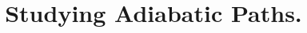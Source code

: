 \documentclass[manuscript,screen,review]{acmart}
\begin{document}

\title{ Studying Adiabatic Paths. }
\maketitle

\newcommand*{\Mbas}{\mathcal{X}^\prime}
\newcommand*{\bas}{\mathcal{X}}
\newcommand*{\sMbas}{\Mbas}
\newcommand*{\QQ}{C_{X}/C_{Z}^\perp }
\newcommand*{\trig}{ Triorthogonal }
\newcommand*{\Hyp}{ Hyperproduct }
\newcommand*{\Cin}{ C_{\text{initial}} }
\newcommand*{\Ctan}{ C_{\text{Tan}} }



\newcommand*{\QACze}{ \mathbf{QAC}_{0} }
\newcommand*{\QNCzef}{ \mathbf{QNC}_{0,f} }
\newcommand*{\QNCon}{ \mathbf{QNC}_{1} }
\newcommand*{\NCon}{ \mathbf{NC}_{1} }
\newcommand*{\noiseQNCon}{ noisy-$\QNCon$ }
\end{document}
